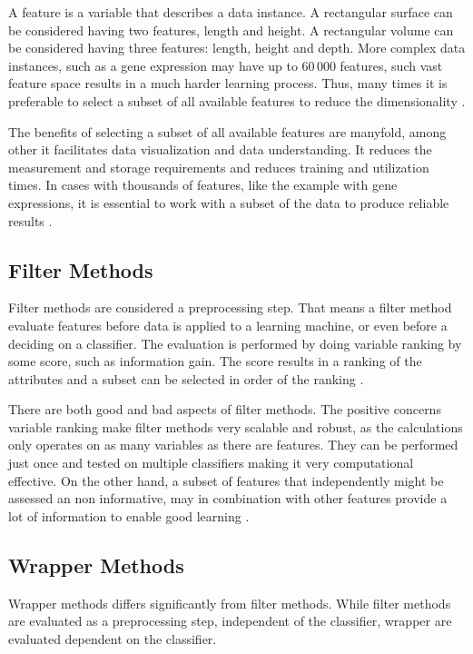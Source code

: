 A feature is a variable that describes a data instance. A rectangular surface can be considered having two features, length and height. A rectangular volume can be considered having three features: length, height and depth. More complex data instances, such as a gene expression may have up to $60\,000$ features, such vast feature space results in a much harder learning process. Thus, many times it is preferable to select a subset of all available features to reduce the dimensionality \parencite{guyon2003}.

The benefits of selecting a subset of all available features are manyfold, among other it facilitates data visualization and data understanding. It reduces the measurement and storage requirements and reduces training and utilization times. In cases with thousands of features, like the example with gene expressions, it is essential to work with a subset of the data to produce reliable results \parencite{guyon2003}.


\subsection{Filter Methods}

Filter methods are considered a preprocessing step. That means a filter method evaluate features before data is applied to a learning machine, or even before a deciding on a classifier. The evaluation is performed by doing variable ranking by some score, such as information gain. The score results in a ranking of the attributes and a subset can be selected in order of the ranking \parencite{guyon2003}.

There are both good and bad aspects of filter methods. The positive concerns variable ranking make filter methods very scalable and robust, as the calculations only operates on as many variables as there are features. They can be performed just once and tested on multiple classifiers making it very computational effective. On the other hand, a subset of features that independently might be assessed an non informative, may in combination with other features provide a lot of information to enable good learning \parencite{guyon2003}.


\subsection{Wrapper Methods}

Wrapper methods differs significantly from filter methods. While filter methods are evaluated as a preprocessing step, independent of the classifier, wrapper are evaluated dependent on the classifier.

